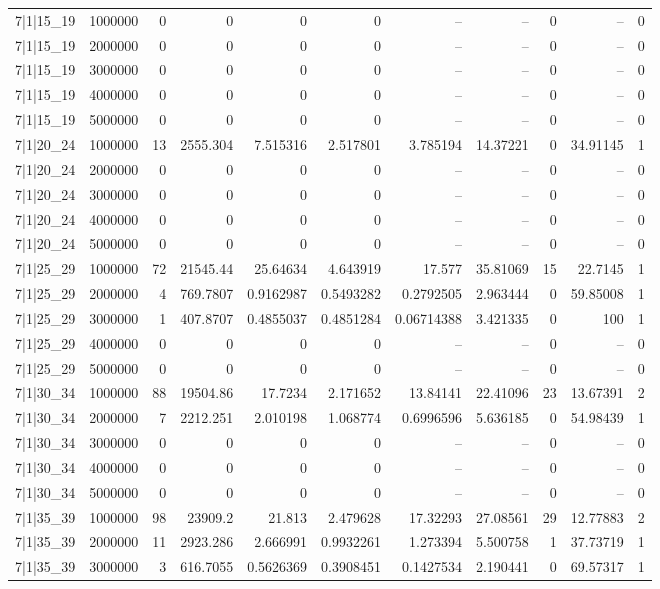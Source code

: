 \begin{tabular}{lrrrrrrrrrr}
7|1|15\_19 & 1000000 & 0 & 0 & 0 & 0 & -- & -- & 0 & -- & 0 \\
7|1|15\_19 & 2000000 & 0 & 0 & 0 & 0 & -- & -- & 0 & -- & 0 \\
7|1|15\_19 & 3000000 & 0 & 0 & 0 & 0 & -- & -- & 0 & -- & 0 \\
7|1|15\_19 & 4000000 & 0 & 0 & 0 & 0 & -- & -- & 0 & -- & 0 \\
7|1|15\_19 & 5000000 & 0 & 0 & 0 & 0 & -- & -- & 0 & -- & 0 \\
7|1|20\_24 & 1000000 & 13 & 2555.304 & 7.515316 & 2.517801 & 3.785194 & 14.37221 & 0 & 34.91145 & 1 \\
7|1|20\_24 & 2000000 & 0 & 0 & 0 & 0 & -- & -- & 0 & -- & 0 \\
7|1|20\_24 & 3000000 & 0 & 0 & 0 & 0 & -- & -- & 0 & -- & 0 \\
7|1|20\_24 & 4000000 & 0 & 0 & 0 & 0 & -- & -- & 0 & -- & 0 \\
7|1|20\_24 & 5000000 & 0 & 0 & 0 & 0 & -- & -- & 0 & -- & 0 \\
7|1|25\_29 & 1000000 & 72 & 21545.44 & 25.64634 & 4.643919 & 17.577 & 35.81069 & 15 & 22.7145 & 1 \\
7|1|25\_29 & 2000000 & 4 & 769.7807 & 0.9162987 & 0.5493282 & 0.2792505 & 2.963444 & 0 & 59.85008 & 1 \\
7|1|25\_29 & 3000000 & 1 & 407.8707 & 0.4855037 & 0.4851284 & 0.06714388 & 3.421335 & 0 & 100 & 1 \\
7|1|25\_29 & 4000000 & 0 & 0 & 0 & 0 & -- & -- & 0 & -- & 0 \\
7|1|25\_29 & 5000000 & 0 & 0 & 0 & 0 & -- & -- & 0 & -- & 0 \\
7|1|30\_34 & 1000000 & 88 & 19504.86 & 17.7234 & 2.171652 & 13.84141 & 22.41096 & 23 & 13.67391 & 2 \\
7|1|30\_34 & 2000000 & 7 & 2212.251 & 2.010198 & 1.068774 & 0.6996596 & 5.636185 & 0 & 54.98439 & 1 \\
7|1|30\_34 & 3000000 & 0 & 0 & 0 & 0 & -- & -- & 0 & -- & 0 \\
7|1|30\_34 & 4000000 & 0 & 0 & 0 & 0 & -- & -- & 0 & -- & 0 \\
7|1|30\_34 & 5000000 & 0 & 0 & 0 & 0 & -- & -- & 0 & -- & 0 \\
7|1|35\_39 & 1000000 & 98 & 23909.2 & 21.813 & 2.479628 & 17.32293 & 27.08561 & 29 & 12.77883 & 2 \\
7|1|35\_39 & 2000000 & 11 & 2923.286 & 2.666991 & 0.9932261 & 1.273394 & 5.500758 & 1 & 37.73719 & 1 \\
7|1|35\_39 & 3000000 & 3 & 616.7055 & 0.5626369 & 0.3908451 & 0.1427534 & 2.190441 & 0 & 69.57317 & 1 \\

\end{tabular}
